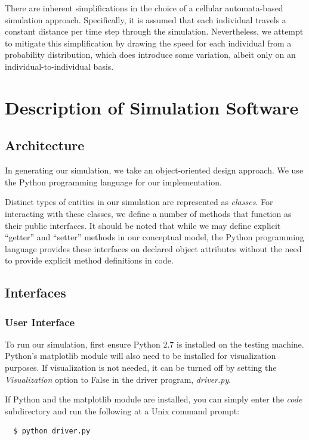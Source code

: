 \documentclass[12pt]{article}
\begin{document}
There are inherent simplifications in the choice of a cellular automata-based
simulation approach. Specifically, it is assumed that each individual travels
a constant distance per time step through the simulation. Nevertheless, we
attempt to mitigate this simplification by drawing the speed for each
individual from a probability distribution, which does introduce some
variation, albeit only on an individual-to-individual basis.

\section{Description of Simulation Software}

\subsection{Architecture}
In generating our simulation, we take an object-oriented design approach. We use
the Python programming language for our implementation.

Distinct types of entities in our simulation are represented as
\textit{classes}. For interacting with these classes, we define a number of
methods that function as their public interfaces. It should be noted that while
we may define explicit ``getter'' and ``setter'' methods in our conceptual model,
the Python programming language provides these interfaces on declared object
attributes without the need to provide explicit method definitions in code.

\subsection{Interfaces}

\subsubsection{User Interface}

To run our simulation, first ensure Python 2.7 is installed on the testing
machine. Python's matplotlib module will also need to be installed for
visualization purposes. If visualization is not needed, it can be turned
off by setting the \textit{Visualization} option to False in the driver program,
\textit{driver.py}.

If Python and the matplotlib module are installed, you can simply enter the
\textit{code} subdirectory and run the following at a Unix command prompt:

\begin{lstlisting}
  $ python driver.py
\end{lstlisting}
\end{document}

